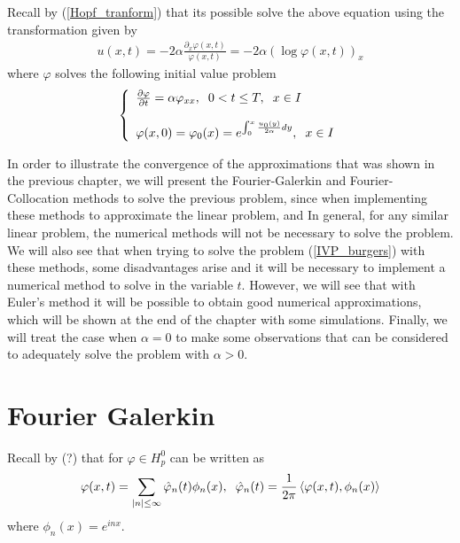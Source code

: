 	Recall by (\ref{Hopf_tranform}) that its possible solve the above equation using the transformation given by 
	\begin{align*}
		u(x, t) = - 2 \alpha \frac{\partial_{x} \varphi(x, t)}{\varphi(x, t)} = - 2 \alpha \left( \log{\varphi(x, t)} \right)_x
	\end{align*}
	where $\varphi$ solves the following initial value problem
	\begin{align*}
		\left \lbrace \begin{array}{ll}
			\frac{\partial \varphi}{\partial t} = \alpha \varphi_{xx}, \hspace{2mm} 0 < t \leq T, \hspace{2mm} x \in I \\
			\\
			\varphi(x, 0) = \displaystyle \varphi_0 (x) = e^{ \int_{0}^{x} \frac{u_0(y)}{2 \alpha} dy}, \hspace{2mm} x \in I
		\end{array}  \right .
	\end{align*}
	
	In order to illustrate the convergence of the approximations that was shown in the previous chapter, we will present the Fourier-Galerkin and Fourier-Collocation methods to solve the previous problem, since when implementing these methods to approximate the linear problem, and In general, for any similar linear problem,  the numerical methods will not be necessary to solve the problem. \\
	
	We will also see that when trying to solve the problem (\ref{IVP_burgers}) with these methods, some disadvantages arise and it will be necessary to implement a numerical method to solve in the variable $t$. However, we will see that with Euler's method it will be possible to obtain good numerical approximations, which will be shown at the end of the chapter with some simulations. Finally, we will treat the case when $\alpha = 0$ to make some observations that can be considered to adequately solve the problem with $\alpha> 0$.
		
    \section{Fourier Galerkin}
	\vspace{0.3cm} 
	
	Recall by (?) that for $\varphi \in H^0_p$ can be written as
	\begin{align*}
		\varphi (x, t) = \displaystyle \sum_{|n| \leq \infty} \hat{\varphi}_n (t) \phi_n (x), \hspace{2mm} \hat{\varphi}_n (t) = \frac{1}{2 \pi} \left\langle \varphi (x, t), \phi_n (x) \right\rangle  
	\end{align*}
	where $\phi_n (x) = e^{inx}$.\\
	
